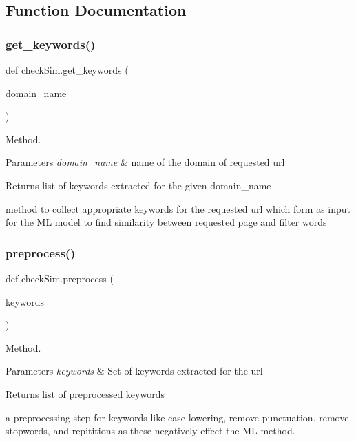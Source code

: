 \subsection{Function Documentation}
\mbox{\label{namespacecheckSim_a83651c0eb2cb80d5549cd9f42cb2ffec}} 
\subsubsection{\texorpdfstring{get\+\_\+keywords()}{get\_keywords()}}
{\footnotesize\ttfamily def check\+Sim.\+get\+\_\+keywords (\begin{DoxyParamCaption}\item[{}]{domain\+\_\+name }\end{DoxyParamCaption})}



Method. 


\begin{DoxyParams}{Parameters}
{\em domain\+\_\+name} & name of the domain of requested url \\
\hline
\end{DoxyParams}
\begin{DoxyReturn}{Returns}
list of keywords extracted for the given domain\+\_\+name
\end{DoxyReturn}
method to collect appropriate keywords for the requested url which form as input for the ML model to find similarity between requested page and filter words \mbox{\label{namespacecheckSim_aca6a1a250e7f9dc6df75a433dcdb5d6d}} 
\subsubsection{\texorpdfstring{preprocess()}{preprocess()}}
{\footnotesize\ttfamily def check\+Sim.\+preprocess (\begin{DoxyParamCaption}\item[{}]{keywords }\end{DoxyParamCaption})}



Method. 


\begin{DoxyParams}{Parameters}
{\em keywords} & Set of keywords extracted for the url \\
\hline
\end{DoxyParams}
\begin{DoxyReturn}{Returns}
list of preprocessed keywords
\end{DoxyReturn}
a preprocessing step for keywords like case lowering, remove punctuation, remove stopwords, and repititions as these negatively effect the ML method. \mbox{\label{namespacecheckSim_a7dce71b3bf75822b4772d9211132f449}} 
